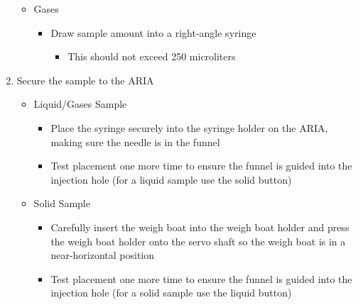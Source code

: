 \documentclass[letterpaper,11pt]{article}
\begin{document}
\begin{enumerate}
\begin{itemize}
        \item Gases
            \begin{itemize}
            \item Draw sample amount into a right-angle syringe  
                \begin{itemize}
                \item This should not exceed 250 microliters
                \end{itemize}
            \end{itemize}
            
        \end{itemize}

     \item Secure the sample to the ARIA
        \begin{itemize}
        \item Liquid/Gases Sample
            \begin{itemize}
            \item Place the syringe securely into the syringe holder on the 
                ARIA, making sure the needle is in the funnel
			\item Test placement one more time to ensure the funnel is guided 
                into the injection hole (for a liquid sample use the 
                solid button)
            \end{itemize}
            
        \item Solid Sample
            \begin{itemize}
            \item Carefully insert the weigh boat into the weigh boat holder and
                press the weigh boat holder onto the servo shaft so the weigh 
                boat is in a near-horizontal position
			\item Test placement one more time to ensure the funnel is guided 
                into the injection hole (for a solid sample use the 
                liquid button)
            \end{itemize}
            
        \end{itemize}
            

\end{enumerate}
\end{document}

